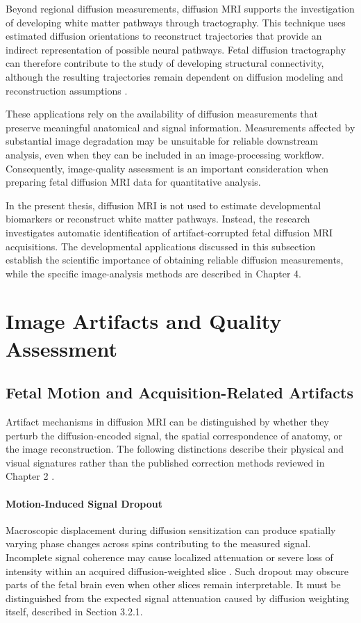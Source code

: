 Beyond regional diffusion measurements, diffusion MRI supports the investigation of developing white matter pathways through tractography. This technique uses estimated diffusion orientations to reconstruct trajectories that provide an indirect representation of possible neural pathways. Fetal diffusion tractography can therefore contribute to the study of developing structural connectivity, although the resulting trajectories remain dependent on diffusion modeling and reconstruction assumptions \autocite{christiaens2019inutero}.

These applications rely on the availability of diffusion measurements that preserve meaningful anatomical and signal information. Measurements affected by substantial image degradation may be unsuitable for reliable downstream analysis, even when they can be included in an image-processing workflow. Consequently, image-quality assessment is an important consideration when preparing fetal diffusion MRI data for quantitative analysis.

In the present thesis, diffusion MRI is not used to estimate developmental biomarkers or reconstruct white matter pathways. Instead, the research investigates automatic identification of artifact-corrupted fetal diffusion MRI acquisitions. The developmental applications discussed in this subsection establish the scientific importance of obtaining reliable diffusion measurements, while the specific image-analysis methods are described in Chapter 4.

\section{Image Artifacts and Quality Assessment}
\subsection{Fetal Motion and Acquisition-Related Artifacts}

Artifact mechanisms in diffusion MRI can be distinguished by whether they perturb the diffusion-encoded signal, the spatial correspondence of anatomy, or the image reconstruction. The following distinctions describe their physical and visual signatures rather than the published correction methods reviewed in Chapter 2 \autocite{malamateniou2013motion,snoussi2025haitch}.

\paragraph{Motion-Induced Signal Dropout}
Macroscopic displacement during diffusion sensitization can produce spatially varying phase changes across spins contributing to the measured signal. Incomplete signal coherence may cause localized attenuation or severe loss of intensity within an acquired diffusion-weighted slice \autocite{snoussi2025haitch}. Such dropout may obscure parts of the fetal brain even when other slices remain interpretable. It must be distinguished from the expected signal attenuation caused by diffusion weighting itself, described in Section 3.2.1.

